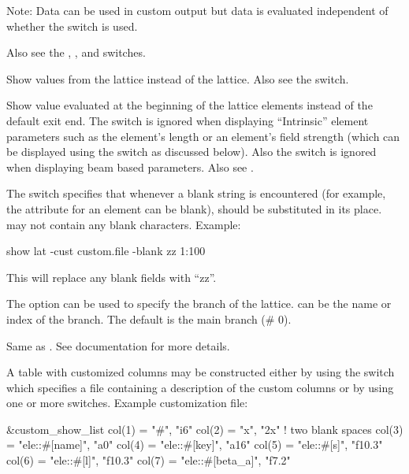 {{{{{{{{{\begin{description}
Note: Data can be used in custom output but data is evaluated independent of whether the
 switch is used.

Also see the , , and  switches.
%
\item[-base] \Newline
  Show values from the  lattice instead of the  lattice. Also see the  switch.
%
\item[-beginning] \Newline
Show value evaluated at the beginning of the lattice elements instead of the default exit end.  The
 switch is ignored when displaying ``Intrinsic'' element parameters such as the
element's length or an element's field strength (which can be displayed using the 
switch as discussed below). Also the  switch is ignored when displaying beam based
parameters. Also see .
%
\item[-blank_replacement <string>] \Newline
The  switch specifies that whenever a blank string is encountered (for
example, the  attribute for an element can be blank),  should be substituted
in its place.  may not contain any blank characters. Example:
\begin{example}
  show lat -cust custom.file -blank zz 1:100
\end{example}
This will replace any blank fields with ``zz''.
%
\item[-branch] \Newline
The  option can be used to specify the branch of the lattice.
 can be the name or index of the branch.  The default is the main branch (\# 0).
%
\item[-center] \Newline
Same as . See  documentation for more details.
%
\item[-custom <file_name>] \Newline
A table with customized columns may be constructed either by using the  switch which
specifies a file containing a description of the custom columns or by using one or more
 switches. Example customization file:
\begin{example}
  &custom_show_list
    col(1)  = "#",                      "i6"  
    col(2)  = "x",                      "2x"    ! two blank spaces
    col(3)  = "ele::#[name]",           "a0"  
    col(4)  = "ele::#[key]",            "a16"
    col(5)  = "ele::#[s]",              "f10.3"
    col(6)  = "ele::#[l]",              "f10.3"
    col(7)  = "ele::#[beta_a]",         "f7.2"

\end{example}
\end{description}}}}}}}}}}
